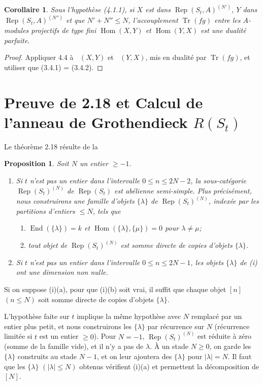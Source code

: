 \documentclass[11pt,a4paper]{article}
\theoremstyle{plain}
\newtheorem{proposition}[theorem]{Proposition}
\newtheorem{corollary}[theorem]{Corollaire}
\theoremstyle{definition}
\DeclareMathOperator{\Hom}{Hom}
\DeclareMathOperator{\End}{End}
\DeclareMathOperator{\Tr}{Tr}
\DeclareMathOperator{\Rep}{Rep}
\DeclareMathOperator{\iHom}{\underline{Hom}}
\begin{document}
\begin{corollary}
Sous l'hypoth\`ese (4.1.1), si $X$ est dans $\Rep(S_t, A)^{(N')}$, $Y$ dans $\Rep(S_t, A)^{(N'')}$ et que $N' + N'' \leq N$, l'accouplement $\Tr(fg)$ entre les $A$-modules projectifs de type fini $\Hom(X, Y)$ et $\Hom(Y, X)$ est une dualit\'e parfaite.
\end{corollary}

\begin{proof}
Appliquer 4.4 \`a $\iHom(X, Y)$ et $\iHom(Y, X)$, mis en dualit\'e par $\Tr(fg)$, et utiliser que (3.4.1) = (3.4.2).
\end{proof}


\section{Preuve de 2.18 et Calcul de l'anneau de Grothendieck $R(S_t)$}

Le th\'eor\`eme 2.18 r\'esulte de la

\begin{proposition}
Soit $N$ un entier $\geq -1$.
\begin{enumerate}[label=(\roman*)]
\item Si $t$ n'est pas un entier dans l'intervalle $0 \leq n \leq 2N-2$, la sous-cat\'egorie $\Rep(S_t)^{(N)}$ de $\Rep(S_t)$ est ab\'elienne semi-simple. Plus pr\'ecis\'ement, nous construirons une famille d'objets $\{\lambda\}$ de $\Rep(S_t)^{(N)}$, index\'ee par les partitions d'entiers $\leq N$, tels que
\begin{enumerate}[label=(\alph*)]
\item $\End(\{\lambda\}) = k$ et $\Hom(\{\lambda\}, \{\mu\}) = 0$ pour $\lambda \neq \mu$;
\item tout objet de $\Rep(S_t)^{(N)}$ est somme directe de copies d'objets $\{\lambda\}$.
\end{enumerate}
\item Si $t$ n'est pas un entier dans l'intervalle $0 \leq n \leq 2N-1$, les objets $\{\lambda\}$ de (i) ont une dimension non nulle.
\end{enumerate}
\end{proposition}

Si on suppose (i)(a), pour que (i)(b) soit vrai, il suffit que chaque objet $[n]$ $(n \leq N)$ soit somme directe de copies d'objets $\{\lambda\}$.

L'hypoth\`ese faite sur $t$ implique la m\^eme hypoth\`ese avec $N$ remplac\'e par un entier plus petit, et nous construirons les $\{\lambda\}$ par r\'ecurrence sur $N$ (r\'ecurrence limit\'ee si $t$ est un entier $\geq 0$). Pour $N = -1$, $\Rep(S_t)^{(N)}$ est r\'eduite \`a z\'ero (somme de la famille vide), et il n'y a pas de $\lambda$. \`A un stade $N \geq 0$, on garde les $\{\lambda\}$ construits au stade $N-1$, et on leur ajoutera des $\{\lambda\}$ pour $|\lambda| = N$. Il faut que les $\{\lambda\}$ $(|\lambda| \leq N)$ obtenus v\'erifient (i)(a) et permettent la d\'ecomposition de $[N]$.
\end{document}
